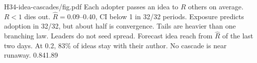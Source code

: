 {H34-idea-cascades/fig.pdf}
{Each adopter passes an idea to $R$ others on average. $R<1$ dies out.}
{$\hat R=0.09$--0.40, CI below 1 in 32/32 periods. Exposure predicts adoption in 32/32, but about half is convergence. Tails are heavier than one branching law. Leaders do not seed spread.}
{Forecast idea reach from $\hat R$ of the last two days. At 0.2, 83\% of ideas stay with their author. No cascade is near runaway.}
{0.84}{1.89}
